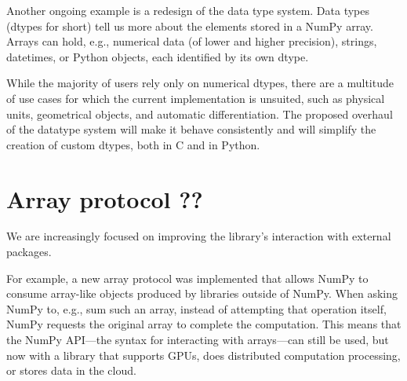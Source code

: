 Another ongoing example is a redesign of the data type system.  Data types
(dtypes for short) tell us more about the elements stored in a NumPy array.
Arrays can hold, e.g., numerical data (of lower and higher precision), strings,
datetimes, or Python objects, each identified by its own dtype.

While the majority of users rely only on numerical dtypes,
there are a multitude of use cases for which the current implementation is unsuited, such as physical units\cite{astropy,Goldbaum2018,pint},
geometrical objects\cite{pygeos}, and automatic
differentiation\cite{pyadolc}.
The proposed overhaul of the datatype system will make it behave consistently and will simplify the creation of custom dtypes, both in C and in Python.

\section*{Array protocol ??}

We are increasingly focused on improving the library's interaction with external
packages.

For example, a new array protocol was implemented that allows NumPy to consume
array-like objects produced by libraries outside of NumPy.  When asking NumPy
to, e.g., sum such an array, instead of attempting that operation itself, NumPy
requests the original array to complete the computation.  This means that the
NumPy API---the syntax for interacting with arrays---can still be used, but now
with a library that supports GPUs, does distributed computation processing, or
stores data in the cloud.

%
%

